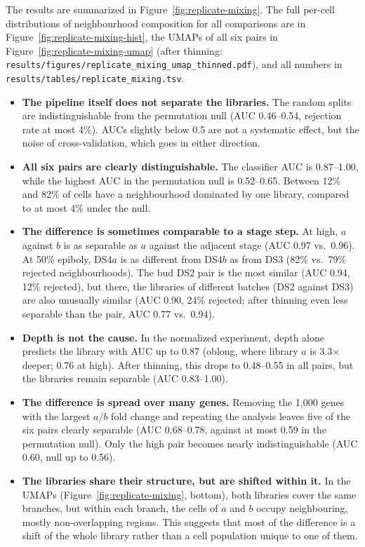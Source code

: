 \documentclass[11pt,a4paper]{article}
\begin{document}
The results are summarized in Figure~\ref{fig:replicate-mixing}. The full per-cell distributions of neighbourhood composition for all comparisons are in Figure~\ref{fig:replicate-mixing-hist}, the UMAPs of all six pairs in Figure~\ref{fig:replicate-mixing-umap} (after thinning: \nolinkurl{results/figures/replicate_mixing_umap_thinned.pdf}), and all numbers in \nolinkurl{results/tables/replicate_mixing.tsv}.
\begin{itemize}
	\item \textbf{The pipeline itself does not separate the libraries.} The random splits are indistinguishable from the permutation null (AUC 0.46--0.54, rejection rate at most 4\%). AUCs slightly below 0.5 are not a systematic effect, but the noise of cross-validation, which goes in either direction.
	\item \textbf{All six pairs are clearly distinguishable.} The classifier AUC is 0.87--1.00, while the highest AUC in the permutation null is 0.52--0.65. Between 12\% and 82\% of cells have a neighbourhood dominated by one library, compared to at most 4\% under the null.
	\item \textbf{The difference is sometimes comparable to a stage step.} At high, $a$ against $b$ is as separable as $a$ against the adjacent stage (AUC 0.97 vs.\ 0.96). At 50\% epiboly, DS4$a$ is as different from DS4$b$ as from DS3 (82\% vs.\ 79\% rejected neighbourhoods). The bud DS2 pair is the most similar (AUC 0.94, 12\% rejected), but there, the libraries of different batches (DS2 against DS3) are also unusually similar (AUC 0.90, 24\% rejected; after thinning even less separable than the pair, AUC 0.77 vs.\ 0.94).
	\item \textbf{Depth is not the cause.} In the normalized experiment, depth alone predicts the library with AUC up to 0.87 (oblong, where library $a$ is 3.3$\times$ deeper; 0.76 at high). After thinning, this drops to 0.48--0.55 in all pairs, but the libraries remain separable (AUC 0.83--1.00).
	\item \textbf{The difference is spread over many genes.} Removing the 1{,}000 genes with the largest $a$/$b$ fold change and repeating the analysis leaves five of the six pairs clearly separable (AUC 0.68--0.78, against at most 0.59 in the permutation null). Only the high pair becomes nearly indistinguishable (AUC 0.60, null up to 0.56).
	\item \textbf{The libraries share their structure, but are shifted within it.} In the UMAPs (Figure~\ref{fig:replicate-mixing}, bottom), both libraries cover the same branches, but within each branch, the cells of $a$ and $b$ occupy neighbouring, mostly non-overlapping regions. This suggests that most of the difference is a shift of the whole library rather than a cell population unique to one of them.
\end{itemize}
\end{document}
